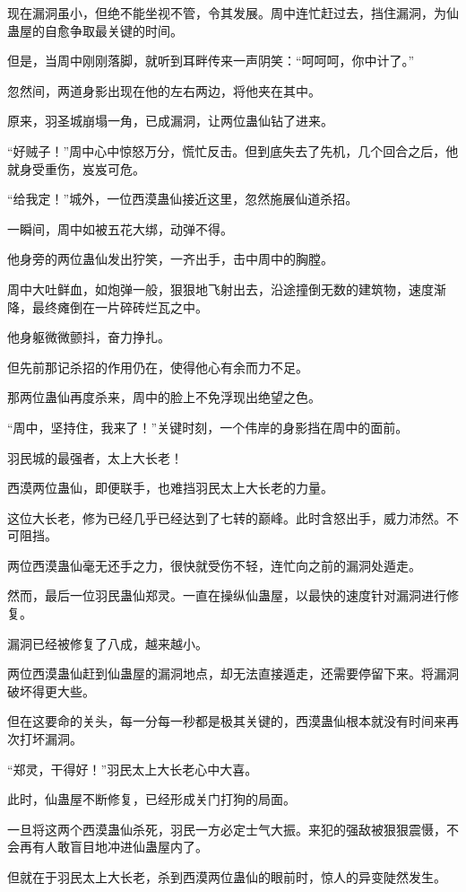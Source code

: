 \begin{this_body}
现在漏洞虽小，但绝不能坐视不管，令其发展。周中连忙赶过去，挡住漏洞，为仙蛊屋的自愈争取最关键的时间。

但是，当周中刚刚落脚，就听到耳畔传来一声阴笑：“呵呵呵，你中计了。”

忽然间，两道身影出现在他的左右两边，将他夹在其中。

原来，羽圣城崩塌一角，已成漏洞，让两位蛊仙钻了进来。

“好贼子！”周中心中惊怒万分，慌忙反击。但到底失去了先机，几个回合之后，他就身受重伤，岌岌可危。

“给我定！”城外，一位西漠蛊仙接近这里，忽然施展仙道杀招。

一瞬间，周中如被五花大绑，动弹不得。

他身旁的两位蛊仙发出狞笑，一齐出手，击中周中的胸膛。

周中大吐鲜血，如炮弹一般，狠狠地飞射出去，沿途撞倒无数的建筑物，速度渐降，最终瘫倒在一片碎砖烂瓦之中。

他身躯微微颤抖，奋力挣扎。

但先前那记杀招的作用仍在，使得他心有余而力不足。

那两位蛊仙再度杀来，周中的脸上不免浮现出绝望之色。

“周中，坚持住，我来了！”关键时刻，一个伟岸的身影挡在周中的面前。

羽民城的最强者，太上大长老！

西漠两位蛊仙，即便联手，也难挡羽民太上大长老的力量。

这位大长老，修为已经几乎已经达到了七转的巅峰。此时含怒出手，威力沛然。不可阻挡。

两位西漠蛊仙毫无还手之力，很快就受伤不轻，连忙向之前的漏洞处遁走。

然而，最后一位羽民蛊仙郑灵。一直在操纵仙蛊屋，以最快的速度针对漏洞进行修复。

漏洞已经被修复了八成，越来越小。

两位西漠蛊仙赶到仙蛊屋的漏洞地点，却无法直接遁走，还需要停留下来。将漏洞破坏得更大些。

但在这要命的关头，每一分每一秒都是极其关键的，西漠蛊仙根本就没有时间来再次打坏漏洞。

“郑灵，干得好！”羽民太上大长老心中大喜。

此时，仙蛊屋不断修复，已经形成关门打狗的局面。

一旦将这两个西漠蛊仙杀死，羽民一方必定士气大振。来犯的强敌被狠狠震慑，不会再有人敢盲目地冲进仙蛊屋内了。

但就在于羽民太上大长老，杀到西漠两位蛊仙的眼前时，惊人的异变陡然发生。


\end{this_body}
